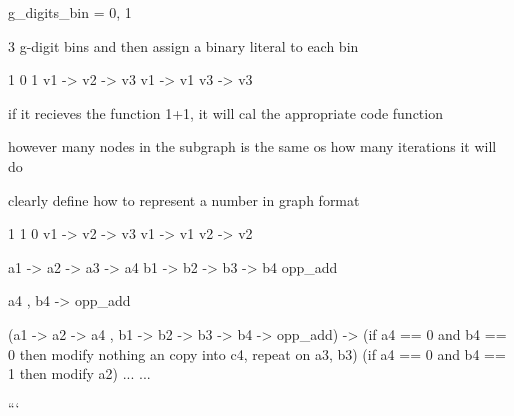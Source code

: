 g_digits_bin = {0, 1}

3 g-digit bins and then assign a binary literal to each bin

1     0     1
v1 -> v2 -> v3
v1 -> v1
v3 -> v3

if it recieves the function 1+1, it will cal the appropriate code function

however many nodes in the subgraph is the same os how many iterations it will do

clearly define how to represent a number in graph format

1     1     0
v1 -> v2 -> v3
v1 -> v1
v2 -> v2



a1 -> a2 -> a3 -> a4
b1 -> b2 -> b3 -> b4
opp_add

a4 , b4 -> opp_add


(a1 -> a2 -> a4 , b1 -> b2 -> b3 -> b4 -> opp_add) -> 
    (if a4 == 0 and b4 == 0 then modify nothing an copy into c4, repeat on a3, b3)
    (if a4 == 0 and b4 == 1 then modify a2)
    ...
    ...




```